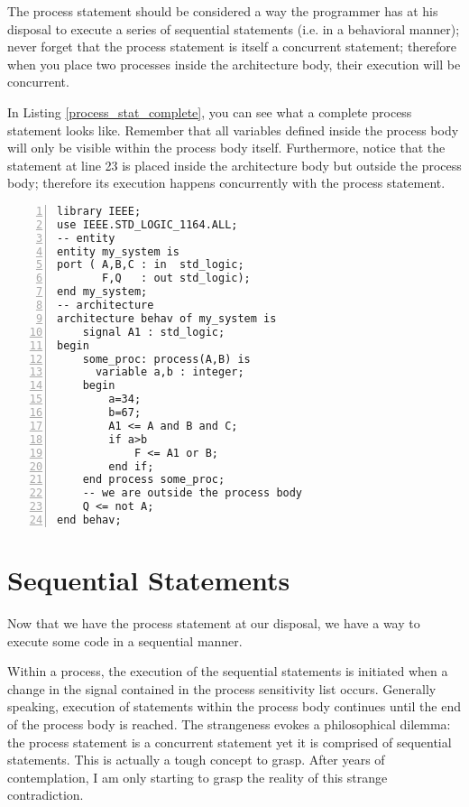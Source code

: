 The process statement should be considered a way the programmer has at his disposal to execute a series of sequential statements (i.e. in a behavioral manner); never forget that the process statement is itself a concurrent statement; therefore when you place two processes inside the architecture body, their execution will be concurrent.

In Listing \ref{process_stat_complete}, you can see what a complete process statement looks like. Remember that all variables defined inside the process body will only be visible within the process body itself. Furthermore, notice that the statement at line 23 is placed inside the architecture body but outside the process body; therefore its execution happens concurrently with the process statement.
\begin{lstlisting}[numbers=left,label=process_stat_complete, caption=Use of the process statement.]
library IEEE;
use IEEE.STD_LOGIC_1164.ALL;
-- entity
entity my_system is
port ( A,B,C : in  std_logic;
       F,Q   : out std_logic);
end my_system;
-- architecture
architecture behav of my_system is
	signal A1 : std_logic;
begin
	some_proc: process(A,B) is
	  variable a,b : integer;
	begin
		a=34;
		b=67;
		A1 <= A and B and C;
		if a>b
			F <= A1 or B;
		end if;
	end process some_proc;
	-- we are outside the process body	
	Q <= not A;
end behav;
\end{lstlisting}

\section{Sequential Statements}
Now that we have the process statement at our disposal, we have a way to execute some code in a sequential manner.

Within a process, the execution of the sequential statements is initiated when a change in the signal contained in the process sensitivity list occurs. Generally speaking, execution of statements within the process body continues until the end of the process body is reached. The strangeness evokes a philosophical dilemma: the process statement is a concurrent statement yet it is comprised of sequential statements. This is actually a tough concept to grasp. After years of contemplation, I am only starting to grasp the reality of this strange contradiction. 

